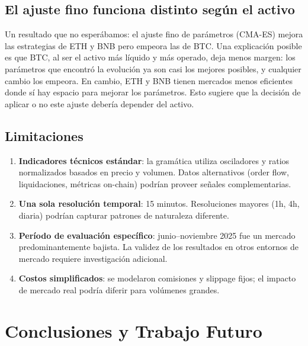 \documentclass[12pt,a4paper]{article}
\begin{document}
\subsection{El ajuste fino funciona distinto según el activo}

Un resultado que no esperábamos: el ajuste fino de parámetros (CMA-ES) mejora las
estrategias de ETH y BNB pero empeora las de BTC. Una explicación posible es que BTC,
al ser el activo más líquido y más operado, deja menos margen: los parámetros que
encontró la evolución ya son casi los mejores posibles, y cualquier cambio los
empeora. En cambio, ETH y BNB tienen mercados menos eficientes donde sí hay espacio
para mejorar los parámetros. Esto sugiere que la decisión de aplicar o no este ajuste
debería depender del activo.

\subsection{Limitaciones}

\begin{enumerate}
\item \textbf{Indicadores técnicos estándar}: la gramática utiliza osciladores y ratios
  normalizados basados en precio y volumen. Datos alternativos (order flow,
  liquidaciones, métricas on-chain) podrían proveer señales complementarias.

\item \textbf{Una sola resolución temporal}: 15 minutos. Resoluciones mayores (1h, 4h,
  diaria) podrían capturar patrones de naturaleza diferente.

\item \textbf{Período de evaluación específico}: junio--noviembre 2025 fue un mercado
  predominantemente bajista. La validez de los resultados en otros entornos de mercado
  requiere investigación adicional.

\item \textbf{Costos simplificados}: se modelaron comisiones y slippage fijos; el
  impacto de mercado real podría diferir para volúmenes grandes.
\end{enumerate}

\section{Conclusiones y Trabajo Futuro}
\label{sec:conclusions}
\end{document}

